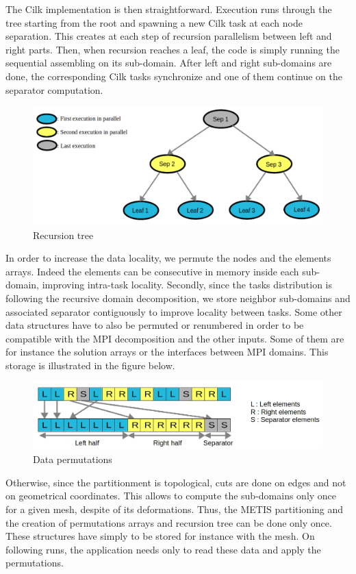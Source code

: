 \documentclass{IOS-Book-Article}
\begin{document}
The Cilk implementation is then straightforward. Execution runs through the tree starting from the root and spawning a new Cilk task at each node separation.
This creates at each step of recursion parallelism between left and right parts.
Then, when recursion reaches a leaf, the code is simply running the sequential assembling on its sub-domain.
After left and right sub-domains are done, the corresponding Cilk tasks synchronize and one of them continue on the separator computation.
\begin{figure}[htp]
 \centering
 \label{fig3}
 \includegraphics[scale=0.25]{Recursion_tree.png}
 \caption{Recursion tree}
\end{figure}
In order to increase the data locality, we permute the nodes and the elements arrays. Indeed the elements can be consecutive in memory inside each sub-domain,
improving intra-task locality.
Secondly, since the tasks distribution is following the recursive domain decomposition, we store neighbor sub-domains and associated separator contiguously to improve
locality between tasks. Some other data structures have to also be permuted or renumbered in order to be compatible with the MPI decomposition and the other inputs.
Some of them are for instance the solution arrays or the interfaces between MPI domains.
This storage is illustrated in the figure below.
\begin{figure}[htp]
 \centering
 \label{fig4}
 \includegraphics[scale=0.25]{Data_permutations.png}
 \caption{Data permutations}
\end{figure}
Otherwise, since the partitionment is topological, cuts are done on edges and not on geometrical coordinates. This allows to compute the sub-domains only once
for a given mesh, despite of its deformations. Thus, the METIS partitioning and the creation of permutations arrays and recursion tree can be done only once.
These structures have simply to be stored for instance with the mesh. On following runs, the application needs only to read these data and apply the permutations.
\end{document}

